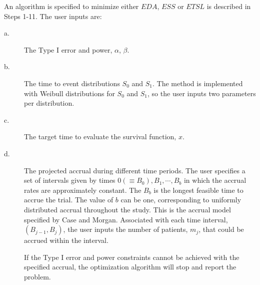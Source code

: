 \documentclass[12pt]{article}
\begin{document}
An algorithm is specified to minimize either $EDA$, $ESS$ or $ETSL$ is described in Steps 1-11.
The user inputs are:
\begin{description}
    \item[a.]
 The Type I error and power, $\alpha$, $\beta$.
    \item[b.]
    The time to event distributions $S_0$ and $S_1$.  The  method is
implemented with Weibull distributions for $S_0$ and $S_1$, so the user inputs  two parameters per distribution.
    \item[c.]
    The target time to evaluate the survival function, $x$.
    \item[d.]
    The projected accrual during different time periods.  The user
 specifies a set of intervals given by times $0 (\equiv
B_0),B_1,\cdots,B_b$ in which the accrual rates are approximately
constant. The $B_b$ is the longest feasible time to accrue the trial.
The value of $b$ can be one, corresponding to uniformly distributed
accrual throughout the study.  This is the accrual model specified by
Case and Morgan.  Associated with each time interval, $(B_{j-1},B_j)$,
the user inputs the number of patients, $m_j$, that could be accrued within the interval.

  If the Type I error and power constraints cannot be achieved with
the specified accrual, the optimization algorithm will stop and report the problem.
\end{description}
\vskip 24pt
\end{document}
